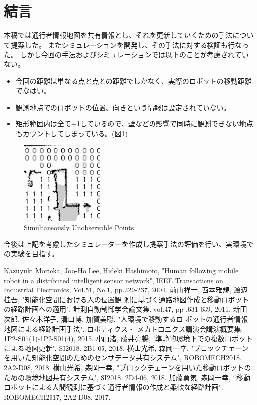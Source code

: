 \documentclass{jsarticle}
\begin{document}
\section{結言}
本稿では通行者情報地図を共有情報とし、それを更新していくための手法について提案した。
またシミュレーションを開発し、その手法に対する検証も行なった。
しかし今回の手法およびシミュレーションでは以下のことが考慮されていない。
\begin{itemize}
  \item 今回の距離は単なる点と点との距離でしかなく、実際のロボットの移動距離でなはい。
  \item 観測地点でのロボットの位置、向きという情報は設定されていない。
  \item 矩形範囲内は全て+1しているので、壁などの影響で同時に観測できない地点もカウントしてしまっている。(図\ref{fig: impossible})
\end{itemize}
\begin{figure}[tbh]
 \centering
  \includegraphics[height=40mm]{fig/impossible.eps}
  \vspace*{-4mm}
  \caption{Simultaneously Unobservable Points}
  \label{fig: impossible}
\end{figure}

今後は上記を考慮したシミュレーターを作成し提案手法の評価を行い、実環境での実験を目指す。


\footnotesize
\begin{thebibliography}{99}

Kazuyuki Morioka, Joo-Ho Lee, Hideki Hashimoto, "Human following mobile robot in a distributed intelligent sensor network", IEEE Transactions on Industrial Electronics, Vol.51, No.1, pp.229-237, 2004.
前山祥一, 西本雅規, 渡辺桂吾, "知能化空間における人の位置観 測に基づく通路地図作成と移動ロボットの経路計画への適用", 計測自動制御学会論文集, vol.47, pp .631-639, 2011.
新田次郎, 佐々木洋子, 溝口博, 加賀美聡, "人環境で移動するロ ボットの通行者情報地図による経路計画手法", ロボティクス・ メカトロニクス講演会講演概要集, 1P2-S01(1)-1P2-S01(4), 2015.
小山渚, 藤井亮暢, "準静的環境下での複数ロボットによる地図更新", SI2018. 2B1-05, 2018.
横山光希, 森岡一幸, "ブロックチェーンを用いた知能化空間のためのセンサデータ共有システム", ROBOMECH2018. 2A2-D08, 2018.
横山光希, 森岡一幸, "ブロックチェーンを用いた移動ロボットのための環境地図共有システム", SI2018. 2D4-06, 2018.
加藤勇気, 森岡一幸, “移動ロボットによる人間観測に基づく通行者情報の作成と柔軟な経路計画”, ROBOMECH2017, 2A2-D08, 2017.
\end{thebibliography}

\normalsize
\end{document}
